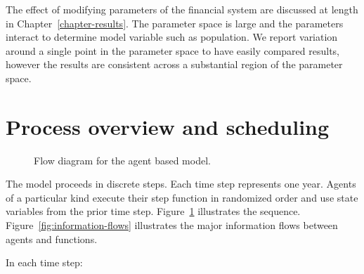 The effect of modifying parameters of the financial system are discussed at length in Chapter~\ref{chapter-results}. 
The parameter space is large and the parameters interact to determine model variable such as population. We report variation around a single point in the parameter space to have easily compared results, however the results are consistent across a substantial region of the parameter space. %

\section{Process overview and scheduling}

\begin{figure}[h!tb]
\centering \vspace{-2cm}
 
\caption[Flow diagram for the agent based model]{Flow diagram for the agent based model.} \label{fig:computational-sequence}
\end{figure}


The model proceeds in discrete steps. Each time step represents one year. Agents of a particular kind execute their step function in randomized order and use state variables from the prior time step. Figure~\ref{fig:computational-sequence} illustrates the sequence. Figure~\ref{fig:information-flows} illustrates the major information flows between agents and functions.



In each time step:

